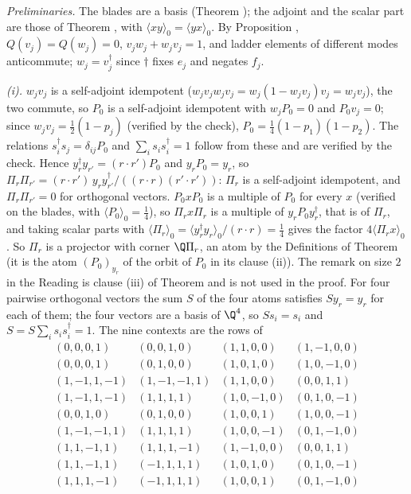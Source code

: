 \emph{Preliminaries.} The blades are a basis (Theorem ); the adjoint and the scalar part are those of Theorem , with $\langle xy\rangle_{0} = \langle yx\rangle_{0}$. By Proposition , $Q(v_{j}) = Q(w_{j}) = 0$, $v_{j}w_{j} + w_{j}v_{j} = 1$, and ladder elements of different modes anticommute; $w_{j} = v_{j}^{\dagger}$ since $\dagger$ fixes $e_{j}$ and negates $f_{j}$.

\emph{(i).} $w_{j}v_{j}$ is a self-adjoint idempotent ($w_{j}v_{j}w_{j}v_{j} = w_{j}(1 - w_{j}v_{j})v_{j} = w_{j}v_{j}$), the two commute, so $P_{0}$ is a self-adjoint idempotent with $w_{j}P_{0} = 0$ and $P_{0}v_{j} = 0$; since $w_{j}v_{j} = \tfrac12(1 - p_{j})$ (verified by the check), $P_{0} = \tfrac14(1 - p_{1})(1 - p_{2})$. The relations $s_{i}^{\dagger}s_{j} = \delta_{ij}P_{0}$ and $\sum_{i}s_{i}s_{i}^{\dagger} = 1$ follow from these and are verified by the check. Hence $y_{r}^{\dagger}y_{r'} = (r \cdot r')P_{0}$ and $y_{r}P_{0} = y_{r}$, so $\Pi_{r}\Pi_{r'} = (r \cdot r')\,y_{r}y_{r'}^{\dagger}/((r \cdot r)(r' \cdot r'))$: $\Pi_{r}$ is a self-adjoint idempotent, and $\Pi_{r}\Pi_{r'} = 0$ for orthogonal vectors. $P_{0}xP_{0}$ is a multiple of $P_{0}$ for every $x$ (verified on the blades, with $\langle P_{0}\rangle_{0} = \tfrac14$), so $\Pi_{r}x\Pi_{r}$ is a multiple of $y_{r}P_{0}y_{r}^{\dagger}$, that is of $\Pi_{r}$, and taking scalar parts with $\langle\Pi_{r}\rangle_{0} = \langle y_{r}^{\dagger}y_{r}\rangle_{0}/(r \cdot r) = \tfrac14$ gives the factor $4\langle\Pi_{r}x\rangle_{0}$. So $\Pi_{r}$ is a projector with corner $\Q\Pi_{r}$, an atom by the Definitions of Theorem  (it is the atom $(P_{0})_{y_{r}}$ of the orbit of $P_{0}$ in its clause (ii)). The remark on size $2$ in the Reading is clause (iii) of Theorem  and is not used in the proof. For four pairwise orthogonal vectors the sum $S$ of the four atoms satisfies $Sy_{r} = y_{r}$ for each of them; the four vectors are a basis of $\Q^{4}$, so $Ss_{i} = s_{i}$ and $S = S\sum_{i}s_{i}s_{i}^{\dagger} = 1$. The nine contexts are the rows of
\[
\begin{array}{llll}
(0,0,0,1) & (0,0,1,0) & (1,1,0,0) & (1,-1,0,0) \\
(0,0,0,1) & (0,1,0,0) & (1,0,1,0) & (1,0,-1,0) \\
(1,-1,1,-1) & (1,-1,-1,1) & (1,1,0,0) & (0,0,1,1) \\
(1,-1,1,-1) & (1,1,1,1) & (1,0,-1,0) & (0,1,0,-1) \\
(0,0,1,0) & (0,1,0,0) & (1,0,0,1) & (1,0,0,-1) \\
(1,-1,-1,1) & (1,1,1,1) & (1,0,0,-1) & (0,1,-1,0) \\
(1,1,-1,1) & (1,1,1,-1) & (1,-1,0,0) & (0,0,1,1) \\
(1,1,-1,1) & (-1,1,1,1) & (1,0,1,0) & (0,1,0,-1) \\
(1,1,1,-1) & (-1,1,1,1) & (1,0,0,1) & (0,1,-1,0)
\end{array}
\]
